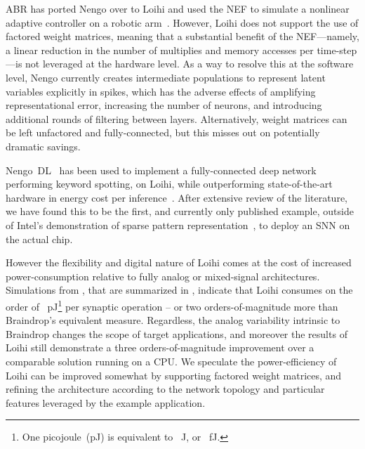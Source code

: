 ABR has ported Nengo over to Loihi and used the NEF to simulate a nonlinear adaptive controller on a robotic arm~\citep[][and personal communication]{dewolf2016}.
However, Loihi does not support the use of factored weight matrices, meaning that a substantial benefit of the NEF---namely, a linear reduction in the number of multiplies and memory accesses per time-step---is not leveraged at the hardware level.
As a way to resolve this at the software level, Nengo currently creates intermediate populations to represent latent variables explicitly in spikes, which has the adverse effects of amplifying representational error, increasing the number of neurons, and introducing additional rounds of filtering between layers.
Alternatively, weight matrices can be left unfactored and fully-connected, but this misses out on potentially dramatic savings.

Nengo~DL~\citep{rasmussen2018nengodl} has been used to implement a fully-connected deep network performing keyword spotting, on Loihi, while outperforming state-of-the-art hardware in energy cost per inference~\citep{blouw2018a}.
After extensive review of the literature, we have found this to be the first, and currently only published example, outside of Intel's demonstration of sparse pattern representation~\citep{tang2017sparse, davies2018loihi}, to deploy an SNN on the actual chip.

However the flexibility and digital nature of Loihi comes at the cost of increased power-consumption relative to fully analog or mixed-signal architectures. 
Simulations from \citet{davies2018loihi}, that are summarized in \citet[][Table~3]{braindrop2019}, indicate that Loihi consumes on the order of ~pJ\footnote{
One picojoule~(pJ) is equivalent to ~J, or ~fJ.}
per synaptic operation -- or two orders-of-magnitude more than Braindrop's equivalent measure.
Regardless, the analog variability intrinsic to Braindrop changes the scope of target applications, and moreover the results of Loihi still demonstrate a three orders-of-magnitude improvement over a comparable solution running on a CPU.
We speculate the power-efficiency of Loihi can be improved somewhat by supporting factored weight matrices, and refining the architecture according to the network topology and particular features leveraged by the example application.

